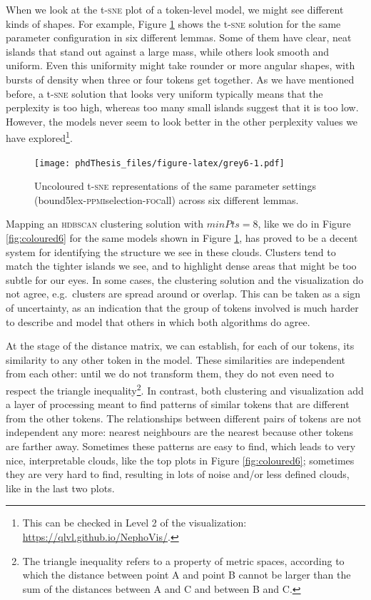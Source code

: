 \documentclass[
]{book}
\begin{document}
When we look at the t-\textsc{sne} plot of a token-level model, we might see different kinds of shapes. For example, Figure \ref{fig:grey6} shows the t-\textsc{sne} solution for the same parameter configuration in six different lemmas. Some of them have clear, neat islands that stand out against a large mass, while others look smooth and uniform. Even this uniformity might take rounder or more angular shapes, with bursts of density when three or four tokens get together. As we have mentioned before, a t-\textsc{sne} solution that looks very uniform typically means that the perplexity is too high, whereas too many small islands suggest that it is too low. However, the models never seem to look better in the other perplexity values we have explored\footnote{This can be checked in Level 2 of the visualization: \url{https://qlvl.github.io/NephoVis/}.}.



\begin{figure}
\centering
\texttt{[image: phdThesis\_files/figure-latex/grey6-1.pdf]}
\caption{\label{fig:grey6}Uncoloured t-\textsc{sne} representations of the same parameter settings (bound5lex-\textsc{ppmi}selection-\textsc{foc}all) across six different lemmas.}
\end{figure}

Mapping an \textsc{hdbscan} clustering solution with \(minPts = 8\), like we do in Figure \ref{fig:coloured6} for the same models shown in Figure \ref{fig:grey6}, has proved to be a decent system for identifying the structure we see in these clouds. Clusters tend to match the tighter islands we see, and to highlight dense areas that might be too subtle for our eyes. In some cases, the clustering solution and the visualization do not agree, e.g.~clusters are spread around or overlap. This can be taken as a sign of uncertainty, as an indication that the group of tokens involved is much harder to describe and model that others in which both algorithms do agree.

At the stage of the distance matrix, we can establish, for each of our tokens, its similarity to any other token in the model. These similarities are independent from each other: until we do not transform them, they do not even need to respect the triangle inequality\footnote{The triangle inequality refers to a property of metric spaces, according to which the distance between point A and point B cannot be larger than the sum of the distances between A and C and between B and C.}. In contrast, both clustering and visualization add a layer of processing meant to find patterns of similar tokens that are different from the other tokens. The relationships between different pairs of tokens are not independent any more: nearest neighbours are the nearest because other tokens are farther away. Sometimes these patterns are easy to find, which leads to very nice, interpretable clouds, like the top plots in Figure \ref{fig:coloured6}; sometimes they are very hard to find, resulting in lots of noise and/or less defined clouds, like in the last two plots.
\end{document}
